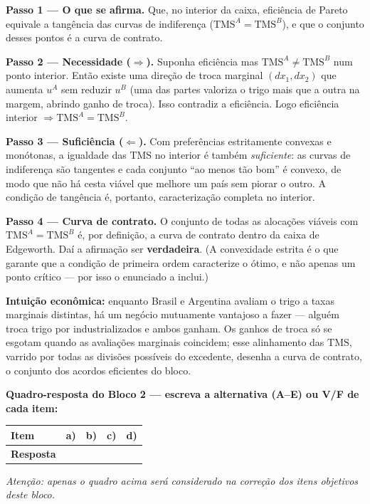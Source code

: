 \begin{solucao}
\textbf{Passo 1 --- O que se afirma.} Que, no interior da caixa, eficiência de Pareto equivale a tangência das curvas de indiferença ($\text{TMS}^A=\text{TMS}^B$), e que o conjunto desses pontos é a curva de contrato.

\textbf{Passo 2 --- Necessidade ($\Rightarrow$).} Suponha eficiência mas $\text{TMS}^A\neq\text{TMS}^B$ num ponto interior. Então existe uma direção de troca marginal $(d x_1, d x_2)$ que aumenta $u^A$ sem reduzir $u^B$ (uma das partes valoriza o trigo mais que a outra na margem, abrindo ganho de troca). Isso contradiz a eficiência. Logo eficiência interior $\Rightarrow \text{TMS}^A=\text{TMS}^B$.

\textbf{Passo 3 --- Suficiência ($\Leftarrow$).} Com preferências estritamente convexas e monótonas, a igualdade das $\text{TMS}$ no interior é também \emph{suficiente}: as curvas de indiferença são tangentes e cada conjunto ``ao menos tão bom'' é convexo, de modo que não há cesta viável que melhore um país sem piorar o outro. A condição de tangência é, portanto, caracterização completa no interior.

\textbf{Passo 4 --- Curva de contrato.} O conjunto de todas as alocações viáveis com $\text{TMS}^A=\text{TMS}^B$ é, por definição, a curva de contrato dentro da caixa de Edgeworth. Daí a afirmação ser \textbf{verdadeira}. (A convexidade estrita é o que garante que a condição de primeira ordem caracterize o ótimo, e não apenas um ponto crítico --- por isso o enunciado a inclui.)

\textbf{Intuição econômica:} enquanto Brasil e Argentina avaliam o trigo a taxas marginais distintas, há um negócio mutuamente vantajoso a fazer --- alguém troca trigo por industrializados e ambos ganham. Os ganhos de troca só se esgotam quando as avaliações marginais coincidem; esse alinhamento das $\text{TMS}$, varrido por todas as divisões possíveis do excedente, desenha a curva de contrato, o conjunto dos acordos eficientes do bloco.
\end{solucao}

\ifsolucao\else
\par\vspace{0.5em}
\begin{center}
\textbf{Quadro-resposta do Bloco 2 --- escreva a alternativa (A--E) ou V/F de cada item:}\\[0.6em]
\renewcommand{\arraystretch}{1.45}
\begin{tabular}{|>{\centering\arraybackslash}p{2.6cm}|>{\centering\arraybackslash}p{1.4cm}|>{\centering\arraybackslash}p{1.4cm}|>{\centering\arraybackslash}p{1.4cm}|>{\centering\arraybackslash}p{1.4cm}|}
  \hline
  \textbf{Item} & a) & b) & c) & d) \\ \hline
  \textbf{Resposta} &  &  &  &  \\ \hline
\end{tabular}
\end{center}
{\small\itshape Atenção: apenas o quadro acima será considerado na correção dos itens objetivos deste bloco.}\par\vspace{0.6em}
\fi

